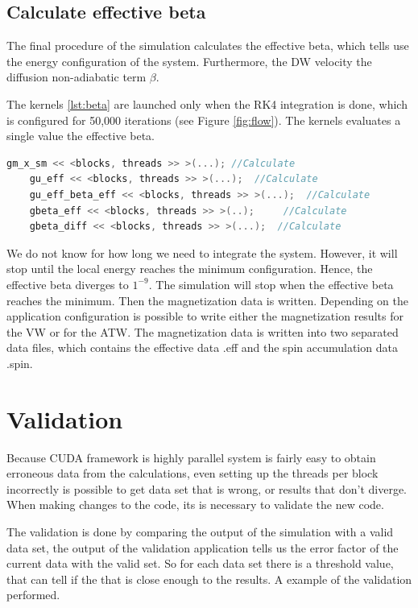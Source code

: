 \subsection{Calculate effective beta}

The final procedure of the simulation calculates the effective beta, which tells use the energy configuration of the system. Furthermore, the DW velocity the diffusion non-adiabatic term $\beta$.

The kernels \ref{lst:beta} are launched only when the RK4 integration is done, which is configured for 50,000 iterations (see Figure \ref{fig:flow}). The kernels evaluates a single value the effective beta.

\begin{lstlisting}[language=C++, label={lst:beta}, caption={Calculate effective beta}]
    gm_x_sm << <blocks, threads >> >(...); //Calculate
    gu_eff << <blocks, threads >> >(...);  //Calculate 
    gu_eff_beta_eff << <blocks, threads >> >(...); 	//Calculate
    gbeta_eff << <blocks, threads >> >(..); 	//Calculate
    gbeta_diff << <blocks, threads >> >(...);  //Calculate             
\end{lstlisting}


We do not know for how long we need to integrate the system. However, it will stop until the local energy reaches the minimum configuration. Hence, the effective beta diverges to $1^{-9}$. The simulation will stop when the effective beta reaches the minimum. Then the magnetization data is written. Depending on the application configuration is possible to write either the magnetization results for the VW or for the ATW. The magnetization data is written into two separated data files, which contains the effective data .eff and the spin accumulation data .spin.

\section{Validation}

Because CUDA framework is highly parallel system is fairly easy to obtain erroneous data from the calculations, even setting up the threads per block incorrectly is possible to get data set that is wrong, or results that don't diverge. When making changes to the code, its is necessary to validate the new code.

The validation is done by comparing the output of the simulation with a valid data set, the output of the validation application tells us the error factor of the current data with the valid set. So for each data set there is a threshold value, that can tell if the that is close enough to the results. A example of the validation performed.

